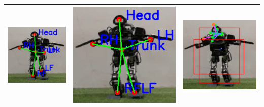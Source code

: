 \begin{longtable}{|c|c|c|}
  \hline
  \includegraphics[scale=0.85]{gambar/nimbro-2.png} & \includegraphics[scale=0.49]{gambar/rcnn-2.png} & \includegraphics[scale=0.68]{gambar/yolo-2.png} \\
  \hline

\end{longtable}
